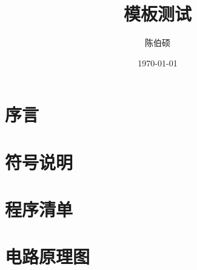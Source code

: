 \documentclass[draft]{XaufeThesisTemplate}
\title{模板测试}
\author{陈伯硕}
\date{\today}
\begin{document}





\listoftodos


% 

\setcounter{tocdepth}{3}
\tableofcontents
\newpage

\setcounter{page}{1}

\ifdraft{
	
}{}
\section{序言}
	
\section{符号说明}
	

\ifdraft{
	
}{}

	\pagebreak

\nocite{*}

\pagebreak
\begin{appendices} %
	\ifdraft{
		
	}{}
  \section{程序清单}
  \section{电路原理图}
\end{appendices}

\pagebreak
\thanksSection
	
\end{document}
